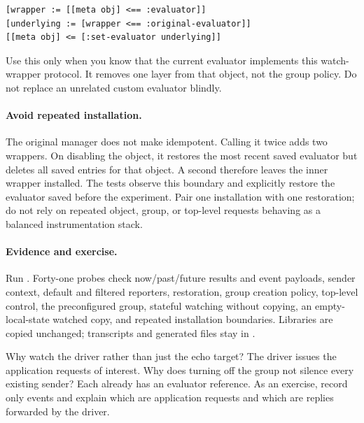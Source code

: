 \begin{codeblock}
\begin{lstlisting}
[wrapper := [[meta obj] <== :evaluator]]
[underlying := [wrapper <== :original-evaluator]]
[[meta obj] <= [:set-evaluator underlying]]
\end{lstlisting}
\end{codeblock}

Use this only when you know that the current evaluator implements this
watch-wrapper protocol. It removes one layer from that object, not the
group policy. Do not replace an unrelated custom evaluator blindly.

\paragraph{Avoid repeated installation.}
The original manager does not make  idempotent. Calling it
twice adds two wrappers. On disabling the object, it restores the most
recent saved evaluator but deletes all saved entries for that object.
A second  therefore leaves the inner wrapper installed.
The tests observe this boundary and explicitly restore the evaluator
saved before the experiment. Pair one installation with one restoration;
do not rely on repeated object, group, or top-level requests behaving as
a balanced instrumentation stack.

\paragraph{Evidence and exercise.}
Run . Forty-one probes check
now/past/future results and event payloads, sender context, default and
filtered reporters, restoration, group creation policy, top-level control,
the preconfigured group, stateful watching without copying, an
empty-local-state watched copy, and repeated
installation boundaries. Libraries are copied unchanged; transcripts and
generated files stay in .

Why watch the driver rather than just the echo target? The driver issues
the application requests of interest. Why does turning off the group not
silence every existing sender? Each already has an evaluator reference.
As an exercise, record only  events and explain which
are application requests and which are replies forwarded by the driver.

